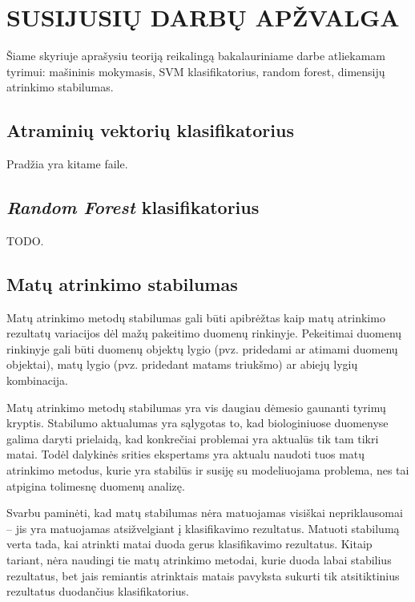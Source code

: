 \section{SUSIJUSIŲ DARBŲ APŽVALGA}
\label{darbu_apzvalga}

Šiame skyriuje aprašysiu teoriją reikalingą bakalauriniame darbe atliekamam tyrimui: mašininis mokymasis, SVM klasifikatorius, random forest, dimensijų atrinkimo stabilumas.



\subsection{Atraminių vektorių klasifikatorius}

Pradžia yra kitame faile.

\subsection{\textit{Random Forest} klasifikatorius}

TODO.

\subsection{Matų atrinkimo stabilumas}

Matų atrinkimo metodų stabilumas gali būti apibrėžtas kaip matų atrinkimo rezultatų variacijos dėl mažų pakeitimo duomenų rinkinyje. Pekeitimai duomenų rinkinyje gali būti duomenų objektų lygio (pvz. pridedami ar atimami duomenų objektai), matų lygio (pvz. pridedant matams triukšmo) ar abiejų lygių kombinacija.

Matų atrinkimo metodų stabilumas yra vis daugiau dėmesio gaunanti tyrimų kryptis. Stabilumo aktualumas yra sąlygotas to, kad biologiniuose duomenyse galima daryti prielaidą, kad konkrečiai problemai yra aktualūs tik tam tikri matai. Todėl dalykinės srities ekspertams yra aktualu naudoti tuos matų atrinkimo metodus, kurie yra stabilūs ir susiję su modeliuojama problema, nes tai atpigina tolimesnę duomenų analizę. 

Svarbu paminėti, kad matų stabilumas nėra matuojamas visiškai nepriklausomai -- jis yra matuojamas atsižvelgiant į klasifikavimo rezultatus. Matuoti stabilumą verta tada, kai atrinkti matai duoda gerus klasifikavimo rezultatus. Kitaip tariant, nėra naudingi tie matų atrinkimo metodai, kurie duoda labai stabilius rezultatus, bet jais remiantis atrinktais matais pavyksta sukurti tik atsitiktinius rezultatus duodančius klasifikatorius.

